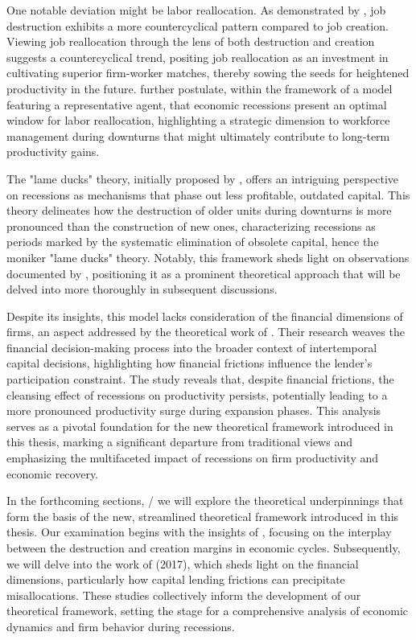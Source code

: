 \documentclass[12pt]{report}
\begin{document}
One notable deviation might be labor reallocation. As demonstrated by \cite{DavHalt92}, job destruction exhibits a
more countercyclical pattern compared to job creation. Viewing job reallocation through the lens of both destruction and
creation suggests a countercyclical trend, positing job reallocation as an investment in cultivating superior
firm-worker matches, thereby sowing the seeds for heightened productivity in the future. \cite{DavHalt92}further
postulate, within the framework of a model featuring a representative agent, that economic recessions present an optimal
window for labor reallocation, highlighting a strategic dimension to workforce management during downturns that might
ultimately contribute to long-term productivity gains. 
 
The "lame ducks" theory, initially proposed by \cite{CabHarm94}, offers an intriguing perspective on
recessions as mechanisms that phase out less profitable, outdated capital. This theory delineates how the destruction of
older units during downturns is more pronounced than the construction of new ones, characterizing recessions as periods
marked by the systematic elimination of obsolete capital, hence the moniker "lame ducks" theory. Notably, this framework
sheds light on observations documented by \cite{DavHalt92}, positioning it as a prominent theoretical
approach that will be delved into more thoroughly in subsequent discussions. 

Despite its insights, this model lacks consideration of the financial dimensions of firms, an aspect addressed by the
theoretical work of \cite{OsePap17}. Their research weaves the financial decision-making process into the
broader context of intertemporal capital decisions, highlighting how financial frictions influence the lender's
participation constraint. The study reveals that, despite financial frictions, the cleansing effect of recessions on
productivity persists, potentially leading to a more pronounced productivity surge during expansion phases. This
analysis serves as a pivotal foundation for the new theoretical framework introduced in this thesis, marking a
significant departure from traditional views and emphasizing the multifaceted impact of recessions on firm productivity
and economic recovery. 

In the forthcoming sections, / we will explore the
theoretical underpinnings that form the basis of the new, streamlined theoretical framework introduced in this thesis.
Our examination begins with the insights of \cite{CabHarm94}, focusing on the interplay between the
destruction and creation margins in economic cycles. Subsequently, we will delve into the work of \cite{OsePap17}
(2017), which sheds light on the financial dimensions, particularly how capital lending frictions can precipitate
misallocations. These studies collectively inform the development of our theoretical framework, setting the stage for a
comprehensive analysis of economic dynamics and firm behavior during recessions. 
\end{document}
